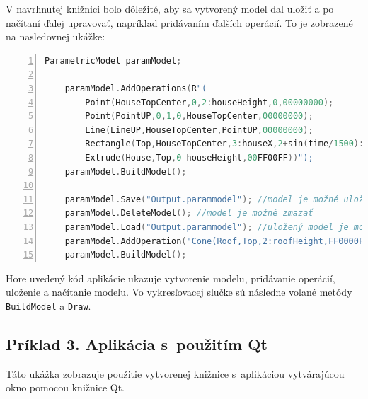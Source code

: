 V navrhnutej knižnici bolo dôležité, aby sa vytvorený model dal uložiť a po načítaní ďalej upravovať, napríklad pridávaním ďalších operácií. To je zobrazené na nasledovnej ukážke:\nopagebreak 
\vspace{10pt}
\begin{minipage}{\linewidth}
\begin{lstlisting}[language=C,frame=tb,numbers=left,emph={void,int,char,double,float,unsigned},emphstyle={\color{blue}},tabsize=2]
	ParametricModel paramModel;

	paramModel.AddOperations(R"(
        Point(HouseTopCenter,0,2:houseHeight,0,00000000);
        Point(PointUP,0,1,0,HouseTopCenter,00000000);
        Line(LineUP,HouseTopCenter,PointUP,00000000);
        Rectangle(Top,HouseTopCenter,3:houseX,2+sin(time/1500):houseY,&\newline&sin(time/1000)-0.2:rotation,LineUP,00000000);
        Extrude(House,Top,0-houseHeight,00FF00FF))");
	paramModel.BuildModel(); 
	
	paramModel.Save("Output.parammodel"); //model je možné uložiť 
	paramModel.DeleteModel(); //model je možné zmazať
	paramModel.Load("Output.parammodel"); //uložený model je možné znova &\newline&načítať 
	paramModel.AddOperation("Cone(Roof,Top,2:roofHeight,FF0000FF)"); &\newline&//pridanie operácie do načítaného modelu
	paramModel.BuildModel();
\end{lstlisting}
\end{minipage}
Hore uvedený kód aplikácie ukazuje vytvorenie modelu, pridávanie operácií, uloženie a načítanie modelu. Vo vykresľovacej slučke sú následne volané metódy \texttt{BuildModel} a \texttt{Draw}.\newpage

\subsection*{Príklad 3. Aplikácia s~použitím Qt}\label{priklad3}
Táto ukážka zobrazuje použitie vytvorenej knižnice s~aplikáciou vytvárajúcou okno pomocou knižnice Qt. 


